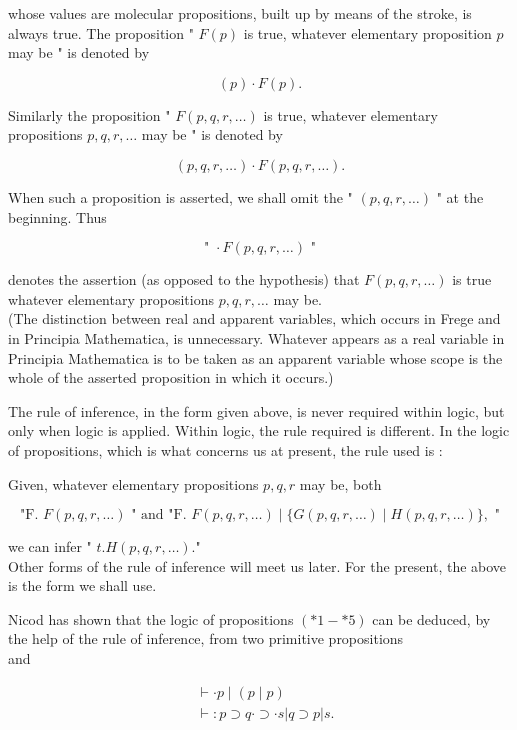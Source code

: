 \documentclass[10pt]{article}
\begin{document}
whose values are molecular propositions, built up by means of the stroke, is always true. The proposition " $F(p)$ is true, whatever elementary proposition $p$ may be " is denoted by

$$
(p) \cdot F(p) .
$$

Similarly the proposition " $F(p, q, r, \ldots)$ is true, whatever elementary propositions $p, q, r, \ldots$ may be " is denoted by

$$
(p, q, r, \ldots) \cdot F(p, q, r, \ldots) .
$$

When such a proposition is asserted, we shall omit the " $(p, q, r, \ldots)$ " at the beginning. Thus

$$
\text { " } \cdot F(p, q, r, \ldots) \text { " }
$$

denotes the assertion (as opposed to the hypothesis) that $F(p, q, r, \ldots)$ is true whatever elementary propositions $p, q, r, \ldots$ may be.\\
(The distinction between real and apparent variables, which occurs in Frege and in Principia Mathematica, is unnecessary. Whatever appears as a real variable in Principia Mathematica is to be taken as an apparent variable whose scope is the whole of the asserted proposition in which it occurs.)

The rule of inference, in the form given above, is never required within logic, but only when logic is applied. Within logic, the rule required is different. In the logic of propositions, which is what concerns us at present, the rule used is :

Given, whatever elementary propositions $p, q, r$ may be, both

$$
\text { "F. } F(p, q, r, \ldots) \text { " and "F. } F(p, q, r, \ldots) \mid\{G(p, q, r, \ldots) \mid H(p, q, r, \ldots)\}, \text { " }
$$

we can infer " $t . H(p, q, r, \ldots)$."\\
Other forms of the rule of inference will meet us later. For the present, the above is the form we shall use.

Nicod has shown that the logic of propositions $(* 1-* 5)$ can be deduced, by the help of the rule of inference, from two primitive propositions\\
and

$$
\begin{aligned}
& \vdash \cdot p \mid(p \mid p) \\
& \vdash: p \supset q \cdot \supset \cdot s|q \supset p| s .
\end{aligned}
$$
\end{document}
